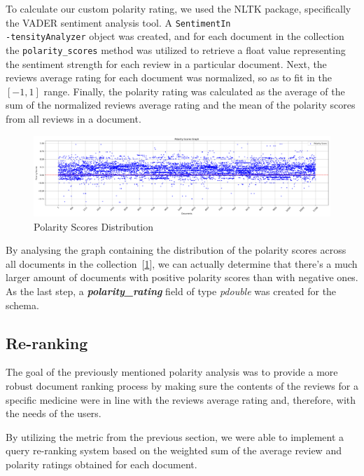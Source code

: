 \documentclass[sigconf]{acmart}
\begin{document}
To calculate our custom polarity rating, we used the NLTK\cite{nltk} package, specifically the VADER sentiment analysis tool\cite{vader}. A \texttt{SentimentIn\\-tensityAnalyzer} object was created, and for each document in the collection the \texttt{polarity\_scores} method was utilized to retrieve a float value representing the sentiment strength for each review in a particular document. Next, the reviews average rating for each document was normalized, so as to fit in the $[-1, 1]$ range. Finally, the polarity rating was calculated as the average of the sum of the normalized reviews average rating and the mean of the polarity scores from all reviews in a document.

\begin{figure}[H]
  \centering
  \includegraphics[width=0.8\linewidth]{polarity_scores.png}
  \caption{Polarity Scores Distribution}
  \label{fig:polarityScores}
\end{figure}

By analysing the graph containing the distribution of the polarity scores across all documents in the collection~[\ref{fig:polarityScores}], we can actually determine that there's a much larger amount of documents with positive polarity scores than with negative ones. As the last step, a \textit{\textbf{polarity\_rating}} field of type \textit{pdouble} was created for the schema.

\subsection{Re-ranking}

The goal of the previously mentioned polarity analysis was to provide a more robust document ranking process by making sure the contents of the reviews for a specific medicine were in line with the reviews average rating and, therefore, with the needs of the users.

By utilizing the metric from the previous section, we were able to implement a query re-ranking system based on the weighted sum of the average review and polarity ratings obtained for each document.
\end{document}
